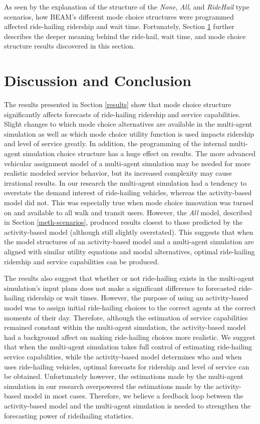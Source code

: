 \documentclass[fancy, masters]{byuthesis}
\begin{document}
As seen by the explanation of the structure of the \emph{None}, \emph{All}, and \emph{RideHail} type scenarios, how BEAM's different mode choice structures were programmed affected ride-hailing ridership and wait time. Fortunately, Section \ref{discussion} further describes the deeper meaning behind the ride-hail, wait time, and mode choice structure results discovered in this section.

\hypertarget{discussion}{%
\chapter{Discussion and Conclusion}\label{discussion}}

The results presented in Section \ref{results} show that mode choice structure significantly affects forecasts of ride-hailing ridership and service capabilities. Slight changes to which mode choice alternatives are available in the multi-agent simulation as well as which mode choice utility function is used impacts ridership and level of service greatly. In addition, the programming of the internal multi-agent simulation choice structure has a huge effect on results. The more advanced vehicular assignment model of a multi-agent simulation may be needed for more realistic modeled service behavior, but its increased complexity may cause irrational results. In our research the multi-agent simulation had a tendency to overstate the demand interest of ride-hailing vehicles, whereas the activity-based model did not. This was especially true when mode choice innovation was turned on and available to all walk and transit users. However, the \emph{All} model, described in Section \ref{meth-scenarios}, produced results closest to those predicted by the activity-based model (although still slightly overstated). This suggests that when the model structures of an activity-based model and a multi-agent simulation are aligned with similar utility equations and modal alternatives, optimal ride-hailing ridership and service capabilities can be produced.

The results also suggest that whether or not ride-hailing exists in the multi-agent simulation's input plans does not make a significant difference to forecasted ride-hailing ridership or wait times. However, the purpose of using an activity-based model was to assign initial ride-hailing choices to the correct agents at the correct moments of their day. Therefore, although the estimation of service capabilities remained constant within the multi-agent simulation, the activity-based model had a background affect on making ride-hailing choices more realistic. We suggest that when the multi-agent simulation takes full control of estimating ride-hailing service capabilities, while the activity-based model determines who and when uses ride-hailing vehicles, optimal forecasts for ridership and level of service can be obtained. Unfortunately however, the estimations made by the multi-agent simulation in our research overpowered the estimations made by the activity-based model in most cases. Therefore, we believe a feedback loop between the activity-based model and the multi-agent simulation is needed to strengthen the forecasting power of rideihailing statistics.
\end{document}
